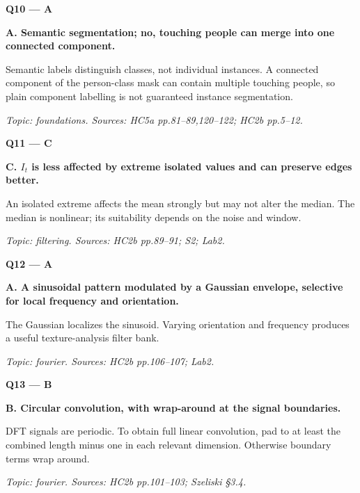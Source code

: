 \documentclass[11pt,a4paper]{article}
\begin{document}
\par\vspace{12pt}
\begin{minipage}{\linewidth}
\textbf{Q10 — A}\par\smallskip
\textbf{A. Semantic segmentation; no,\allowbreak{} touching people can merge into one connected component.}\par
Semantic labels distinguish classes,\allowbreak{} not individual instances. A connected component of the person-class mask can contain multiple touching people,\allowbreak{} so plain component labelling is not guaranteed instance segmentation.\par
{\small\itshape Topic: foundations. Sources: HC5a pp.81–89,\allowbreak{}120–122; HC2b pp.5–12.}

\end{minipage}
\par\vspace{12pt}
\begin{minipage}{\linewidth}
\textbf{Q11 — C}\par\smallskip
\textbf{C. \(I_t\) is less affected by extreme isolated values and can preserve edges better.}\par
An isolated extreme affects the mean strongly but may not alter the median. The median is nonlinear; its suitability depends on the noise and window.\par
{\small\itshape Topic: filtering. Sources: HC2b pp.89–91; S2; Lab2.}

\end{minipage}
\par\vspace{12pt}
\begin{minipage}{\linewidth}
\textbf{Q12 — A}\par\smallskip
\textbf{A. A sinusoidal pattern modulated by a Gaussian envelope,\allowbreak{} selective for local frequency and orientation.}\par
The Gaussian localizes the sinusoid. Varying orientation and frequency produces a useful texture-analysis filter bank.\par
{\small\itshape Topic: fourier. Sources: HC2b pp.106–107; Lab2.}

\end{minipage}
\par\vspace{12pt}
\begin{minipage}{\linewidth}
\textbf{Q13 — B}\par\smallskip
\textbf{B. Circular convolution,\allowbreak{} with wrap-around at the signal boundaries.}\par
DFT signals are periodic. To obtain full linear convolution,\allowbreak{} pad to at least the combined length minus one in each relevant dimension. Otherwise boundary terms wrap around.\par
{\small\itshape Topic: fourier. Sources: HC2b pp.101–103; Szeliski §3.4.}

\end{minipage}
\end{document}
